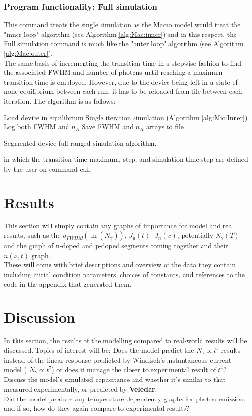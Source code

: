 \documentclass[titlepage]{article}
\begin{document}
\subsubsection{Program functionality: Full simulation}
This command treats the single simulation as the Macro model would treat the "inner loop" algorithm (see Algorithm \ref{alg:Mac:inner}) and in this respect, the Full simulation command is much like the "outer loop" algorithm (see Algorithm \ref{alg:Mac:outer}).\\
The same basis of incrementing the transition time in a stepwise fashion to find the associated FWHM and number of photons until reaching a maximum transition time is employed. However, due to the device being left in a state of none-equilibrium between each run, it has to be reloaded from file between each iteration. The algorithm is as follows:\\
\begin{algorithm}[H]
	{
		Load device in equilibrium\;
		Single iteration simulation (Algorithm \ref{alg:Mic:Inner})\;
		Log both FWHM and $n_R$\;
	}
	Save FWHM and $n_R$ arrays to file\;
	\caption{\label{alg:Mic:Outer} Segmented device full ranged simulation algorithm.}
\end{algorithm}
in which the transition time maximum, step, and simulation time-step are defined by the user on command call.
\section{Results}
This section will simply contain any graphs of importance for model and real results, such as the $\sigma_{FWHM}(\ln(N_{\gamma}))$, $J_n(t)$, $J_n(x)$, potentially $N_{\gamma}(T)$ and the graph of n-doped and p-doped segments coming together and their $n(x,t)$ graph. \\ These will come with brief descriptions and overview of the data they contain including initial condition parameters, choices of constants, and references to the code in the appendix that generated them.
\section{Discussion}
In this section, the results of the modelling compared to real-world results will be discussed. Topics of interest will be: Does the model predict the $N_{\gamma} \propto t^{3} $ results instead of the linear response predicted by Windisch's instantaneous current model ( $N_{\gamma} \propto t^{2} $) or does it manage the closer to experimental result of $t^{4}$?\\
Discuss the model's simulated capacitance and whether it's similar to that measured experimentally, or predicted by \textbf{Veledar}.\\
Did the model produce any temperature dependency graphs for photon emission, and if so, how do they again compare to experimental results?
\end{document}
